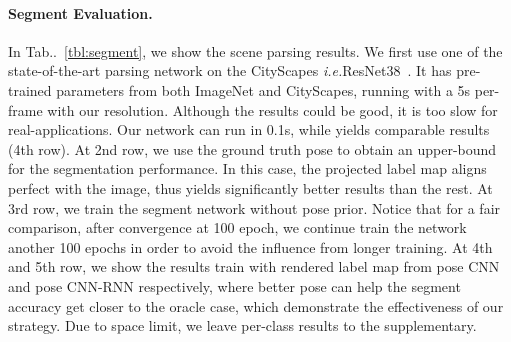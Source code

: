 \documentclass[10pt,twocolumn,letterpaper]{article}
\makeatletter
\newcommand{\tabref}[1]{Tab\onedot~\ref{#1}}
\DeclareRobustCommand\onedot{\futurelet\@let@token\@onedot}
\def\onedot{\ifx\@let@token.\else.\null\fi\xspace}
\def\ie{\emph{i.e.}}
\makeatother
\begin{document}
\paragraph{Segment Evaluation.}
In \tabref{tbl:segment}, we show the scene parsing results. We first use one of the state-of-the-art parsing network on the CityScapes \ie ResNet38~\cite{WuSH16e}. It has pre-trained parameters from both ImageNet and CityScapes, running with a 5s per-frame with our resolution. Although the results could be good, it is too slow for real-applications. Our network can run in 0.1s, while yields comparable results (4th row). At 2nd row, we use the ground truth pose to obtain an upper-bound for the segmentation performance. In this case, the projected label map aligns perfect with the image, thus yields significantly better results than the rest. At 3rd row, we train the segment network without pose prior.  Notice that for a fair comparison, after convergence at 100 epoch, we continue train the network another 100 epochs in order to avoid the influence from longer training. 
At 4th and 5th row, we show the results train with rendered label map from pose CNN and pose CNN-RNN respectively, where better pose can help the segment accuracy get closer to the oracle case, which demonstrate the effectiveness of our strategy. Due to space limit, we leave per-class results to the supplementary.

\end{document}
